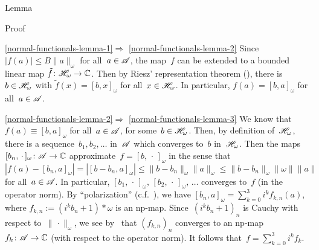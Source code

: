 \documentclass[a]{subfiles}
\begin{document}
\begin{parsec}
\begin{point}{Lemma}
\begin{point}{Proof}
\begin{point}{%
\ref{normal-functionals-lemma-1}$\Longrightarrow$%
\ref{normal-functionals-lemma-2}}%
Since~$\left|f(a)\right|\leq B\|a\|_\omega$ for all~$a\in\mathscr{A}$,
the map~$f$ can be extended to a bounded linear map 
$\tilde{f}\colon \mathscr{H}_\omega\to \mathbb{C}$.
Then by Riesz' representation theorem (\TODO{}),
there is~$b\in \mathscr{H}_\omega$ with $\tilde{f}(x)=[b,x]_\omega$
for all~$x\in \mathscr{H}_\omega$.  
In particular,
$f(a)=[b,a]_\omega$ for all~$a\in \mathscr{A}$.
\end{point}
\begin{point}{\ref{normal-functionals-lemma-2}$\Longrightarrow$%
\ref{normal-functionals-lemma-3}}%
We know that~$f(a)\equiv [b,a]_\omega$ for all~$a\in \mathscr{A}$,
for some~$b\in\mathscr{H}_\omega$.
Then, by definition of~$\mathscr{H}_\omega$,
there is a sequence~$b_1,b_2,\dotsc$ in~$\mathscr{A}$
which converges to~$b$ in~$\mathscr{H}_\omega$.
Then the maps $[b_n,\,\cdot\,]_\omega\colon \mathscr{A}\to \mathbb{C}$
approximate~$f=[b,\,\cdot\,]_\omega$
in the sense that 
$\left|f(a)-[b_n,a]_\omega\right|=\left|[b-b_n,a]_\omega\right|
\leq \|b-b_n\|_\omega \|a\|_\omega
\leq \|b-b_n\|_\omega \|\omega\| \|a\|$
for all~$a\in \mathscr{A}$.
In particular, $[b_1,\,\cdot\,]_\omega,\,[b_2,\,\cdot\,]_\omega,\,\dotsc$
converges to~$f$ (in the operator norm).
By ``polarization'' (c.f.~),
we have $[b_n,a]_\omega = \sum_{k=0}^3 i^kf_{k,n}(a)$,
where $f_{k,n} := (i^kb_n+1)*\omega$ is an np-map.
Since~$(i^kb_n+1)_n$ is Cauchy with respect to~$\|\,\cdot\|_\omega$,
we see by~ that 
$(f_{k,n})_n$ converges to an np-map $f_k\colon \mathscr{A}\to\mathbb{C}$
(with respect to the operator norm).
It follows that~$f=\sum_{k=0}^3 i^k f_k$.


\end{point}
\end{point}
\end{point}
\end{parsec}
\end{document}
